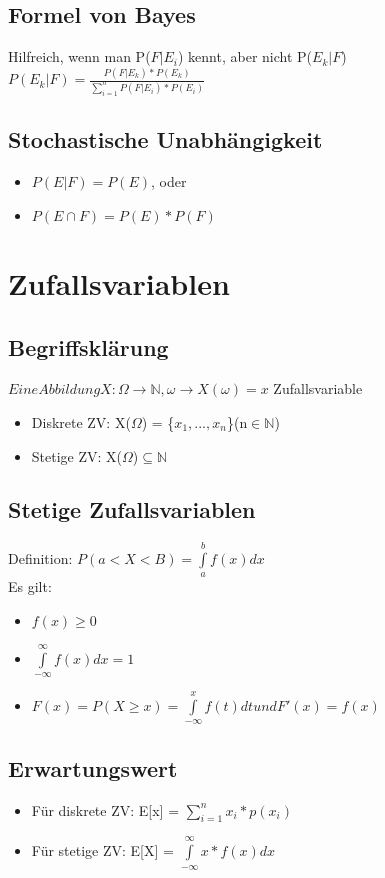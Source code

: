 \documentclass[10pt,landscape,a4paper]{article}
\begin{document}
\begin{multicols}{3}
\subsection{Formel von Bayes}
Hilfreich, wenn man P($F|E_i$) kennt, aber nicht P($E_k|F$) \\
$P(E_k|F) = \frac{P(F|E_k)*P(E_k)}{\sum\limits_{i=1}^n P(F|E_i) * P(E_i)}$

\subsection{Stochastische Unabhängigkeit}
\begin{itemize}
	\item $P(E|F) = P(E)$, oder
	\item $P(E \cap F) = P(E) * P(F)$ 
\end{itemize}

\section{Zufallsvariablen}
\subsection{Begriffsklärung}
$Eine Abbildung X : \Omega \rightarrow \mathbb{N}, \omega \rightarrow X(\omega) = x $ Zufallsvariable
\begin{itemize}
	\item Diskrete ZV: X($\Omega$) = \{$x_1,...,x_n$\}(n$\in \mathbb{N}$)
	\item Stetige ZV: X($\Omega$)$\subseteq \mathbb{N}$ 
\end{itemize}

\subsection{Stetige Zufallsvariablen}
Definition: $P(a<X<B) = \int\limits_a^bf(x)dx$\\
Es gilt:
\begin{itemize}
	\setlength\itemsep{-0.5em}
	\item $f(x) \geq 0$
	\item $\int\limits_{-\infty}^{\infty}f(x)dx = 1$
	\item $F(x) = P(X \geq x) = \int\limits_{-\infty}^xf(t)dt und F'(x) = f(x)$
\end{itemize}

\subsection{Erwartungswert}
\begin{itemize}
	\setlength\itemsep{-0.2em}
	\item Für diskrete ZV: E[x] = $\sum\limits_{i=1}^nx_i * p(x_i)$
	\item Für stetige ZV: E[X] = $\int\limits_{-\infty}^{\infty}x * f(x)dx$
\end{itemize}


\end{multicols}
\end{document}
